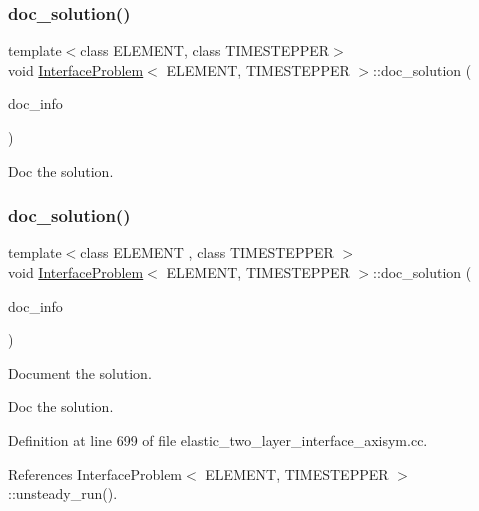 \subsubsection{\texorpdfstring{doc\+\_\+solution()}{doc\_solution()}\hspace{0.1cm}{\footnotesize\ttfamily [1/2]}}
{\footnotesize\ttfamily template$<$class E\+L\+E\+M\+E\+NT, class T\+I\+M\+E\+S\+T\+E\+P\+P\+ER$>$ \\
void \hyperlink{classInterfaceProblem}{Interface\+Problem}$<$ E\+L\+E\+M\+E\+NT, T\+I\+M\+E\+S\+T\+E\+P\+P\+ER $>$\+::doc\+\_\+solution (\begin{DoxyParamCaption}\item[{Doc\+Info \&}]{doc\+\_\+info }\end{DoxyParamCaption})}



Doc the solution. 

\mbox{\label{classInterfaceProblem_a49714e35e94f7d2af0b6ddd22b851f52}} 
\subsubsection{\texorpdfstring{doc\+\_\+solution()}{doc\_solution()}\hspace{0.1cm}{\footnotesize\ttfamily [2/2]}}
{\footnotesize\ttfamily template$<$class E\+L\+E\+M\+E\+NT , class T\+I\+M\+E\+S\+T\+E\+P\+P\+ER $>$ \\
void \hyperlink{classInterfaceProblem}{Interface\+Problem}$<$ E\+L\+E\+M\+E\+NT, T\+I\+M\+E\+S\+T\+E\+P\+P\+ER $>$\+::doc\+\_\+solution (\begin{DoxyParamCaption}\item[{Doc\+Info \&}]{doc\+\_\+info }\end{DoxyParamCaption})}



Document the solution. 

Doc the solution. 

Definition at line 699 of file elastic\+\_\+two\+\_\+layer\+\_\+interface\+\_\+axisym.\+cc.



References Interface\+Problem$<$ E\+L\+E\+M\+E\+N\+T, T\+I\+M\+E\+S\+T\+E\+P\+P\+E\+R $>$\+::unsteady\+\_\+run().



